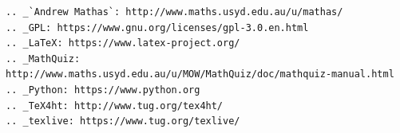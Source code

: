 \documentclass[svgnames]{article}
\begin{document}
\begin{verbatim}
.. _`Andrew Mathas`: http://www.maths.usyd.edu.au/u/mathas/
.. _GPL: https://www.gnu.org/licenses/gpl-3.0.en.html
.. _LaTeX: https://www.latex-project.org/
.. _MathQuiz: http://www.maths.usyd.edu.au/u/MOW/MathQuiz/doc/mathquiz-manual.html
.. _Python: https://www.python.org
.. _TeX4ht: http://www.tug.org/tex4ht/
.. _texlive: https://www.tug.org/texlive/
\end{verbatim}
\end{document}
